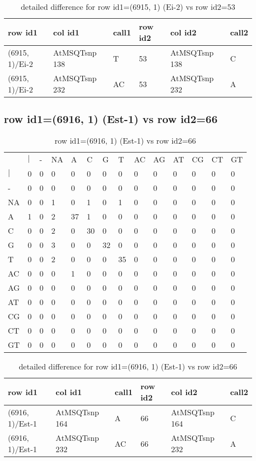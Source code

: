 \begin{center}
\begin{longtable}{|l|l|l|l|l|l|}
\caption{detailed difference for row id1=(6915, 1) (Ei-2) vs row id2=53} \label{table_dm93}\\
\hline
row id1&col id1&call1&row id2&col id2&call2\\
\hline
(6915, 1)/Ei-2&AtMSQTsnp 138&T&53&AtMSQTsnp 138&C\\
(6915, 1)/Ei-2&AtMSQTsnp 232&AC&53&AtMSQTsnp 232&A\\
\hline
\end{longtable}
\end{center}

\subsection{row id1=(6916, 1) (Est-1) vs row id2=66}
\begin{center}
\begin{longtable}{|l|l|l|l|l|l|l|l|l|l|l|l|l|l|}
\caption{row id1=(6916, 1) (Est-1) vs row id2=66} \label{table_dm94}\\
\hline
\\
\hline
&$|$&-&NA&A&C&G&T&AC&AG&AT&CG&CT&GT\\
$|$&0&0&0&0&0&0&0&0&0&0&0&0&0\\
-&0&0&0&0&0&0&0&0&0&0&0&0&0\\
NA&0&0&1&0&1&0&1&0&0&0&0&0&0\\
A&1&0&2&37&1&0&0&0&0&0&0&0&0\\
C&0&0&2&0&30&0&0&0&0&0&0&0&0\\
G&0&0&3&0&0&32&0&0&0&0&0&0&0\\
T&0&0&2&0&0&0&35&0&0&0&0&0&0\\
AC&0&0&0&1&0&0&0&0&0&0&0&0&0\\
AG&0&0&0&0&0&0&0&0&0&0&0&0&0\\
AT&0&0&0&0&0&0&0&0&0&0&0&0&0\\
CG&0&0&0&0&0&0&0&0&0&0&0&0&0\\
CT&0&0&0&0&0&0&0&0&0&0&0&0&0\\
GT&0&0&0&0&0&0&0&0&0&0&0&0&0\\
\hline
\end{longtable}
\end{center}

\begin{center}
\begin{longtable}{|l|l|l|l|l|l|}
\caption{detailed difference for row id1=(6916, 1) (Est-1) vs row id2=66} \label{table_dm95}\\
\hline
row id1&col id1&call1&row id2&col id2&call2\\
\hline
(6916, 1)/Est-1&AtMSQTsnp 164&A&66&AtMSQTsnp 164&C\\
(6916, 1)/Est-1&AtMSQTsnp 232&AC&66&AtMSQTsnp 232&A\\
\hline
\end{longtable}
\end{center}

